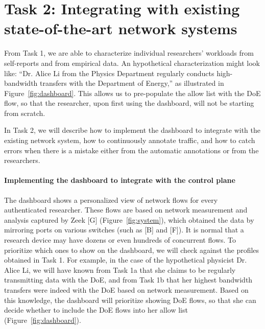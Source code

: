 \section{Task 2: Integrating with existing state-of-the-art network systems}

From Task 1, we are able to characterize individual researchers' workloads from self-reports and from empirical data. An hypothetical characterization might look like: ``Dr. Alice Li from the Physics Department regularly conducts high-bandwidth transfers with the Department of Energy,'' as illustrated in Figure~\ref{fig:dashboard}. This allows us to pre-populate the allow list with the DoE flow, so that the researcher, upon first using the dashboard, will not be starting from scratch.

In Task 2, we will describe how to implement the dashboard to integrate with the existing network system, how to continuously annotate traffic, and how to catch errors when there is a mistake either from the automatic annotations or from the researchers.


\paragraph{Implementing the dashboard to integrate with the control plane}
The dashboard shows a personalized view of network flows for every authenticated researcher. These flows are based on network measurement and analysis captured by Zeek [G] (Figure~\ref{fig:system}), which obtained the data by mirroring ports on various switches (such as [B] and [F]). It is normal that a research device may have dozens or even hundreds of concurrent flows. To prioritize which ones to show on the dashboard, we will check against the profiles obtained in Task 1. For example, in the case of the hypothetical physicist Dr. Alice Li, we will have known from Task 1a that she claims to be regularly transmitting data with the DoE, and from Task 1b that her highest bandwidth transfers were indeed with the DoE based on network measurement. Based on this knowledge, the dashboard will prioritize showing DoE flows, so that she can decide whether to include the DoE flows into her allow list (Figure~\ref{fig:dashboard}).

